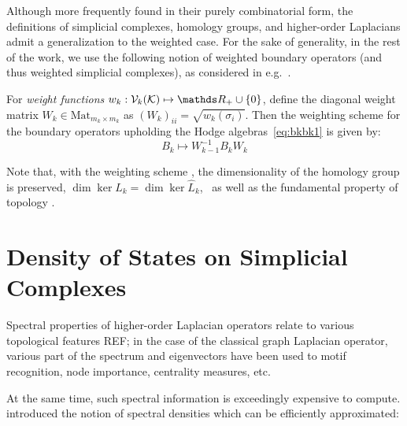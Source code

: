\documentclass{mynotes}
\begin{document}
Although more frequently found in their purely combinatorial form, the definitions of simplicial complexes, homology groups, and higher-order Laplacians admit a generalization to the weighted case. For the sake of generality, in the rest of the work, we use the following notion of weighted boundary operators (and thus weighted simplicial complexes), as considered in e.g.~\cite{guglielmi2023quantifying}.

\begin{definition}
       For \textit{weight functions} \( w_k : \V k \mapsto \ds R_+ \cup \{ 0 \} \), define the diagonal weight matrix \( W_k \in \mathrm{Mat}_{ m_k \times m_k } \) as  \( (W_k)_{ii} = \sqrt{w_k(\sigma_i)}\). Then the  weighting scheme for the boundary operators upholding the Hodge algebras~\eqref{eq:bkbk1} is given by:
      \begin{equation}
            \label{eq:weighting}
            B_k \mapsto W_{k-1}^{-1} B_k W_k
      \end{equation}
\end{definition}

Note that, with the weighting scheme , the dimensionality of the homology group is preserved, \( \dim \ker L_k = \dim \ker \widehat L_k \),~\cite{guglielmi2023quantifying} as well as the fundamental property of topology . 


\chapter{ Density of States on Simplicial Complexes}

Spectral properties of higher-order Laplacian operators relate to various topological features REF; in the case of the classical graph Laplacian operator, various part of the spectrum and eigenvectors have been used to motif recognition, node importance, centrality measures, etc. 

At the same time, such spectral information is exceedingly expensive to compute. \cite{dong2019network} introduced the notion of spectral densities which can be efficiently approximated:
\end{document}
